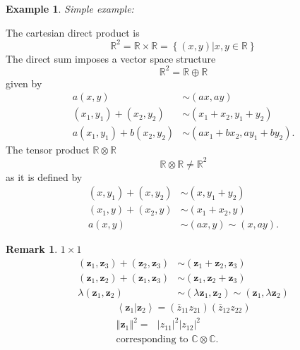 \documentclass[aps,preprint]{revtex4}
\newtheorem{example}[theorem]{Example}
\newtheorem{remark}[theorem]{Remark}
\begin{document}
\begin{example}
Simple example:
\end{example}

The cartesian direct product is 
\begin{equation}
\mathbb{R}^{2}=\mathbb{R\times R}=\left\{ \left. \left( x,y\right)
\right\vert x,y\in \mathbb{R}\right\}
\end{equation}%
The direct sum imposes a vector space structure 
\begin{equation}
\mathbb{R}^{2}=\mathbb{R\oplus R}
\end{equation}%
given by 
\begin{align}
a\left( x,y\right) & \sim \left( ax,ay\right) \\
\left( x_{1},y_{1}\right) +\left( x_{2},y_{2}\right) & \sim \left(
x_{1}+x_{2},y_{1}+y_{2}\right) \\
a\left( x_{1},y_{1}\right) +b\left( x_{2},y_{2}\right) & \sim \left(
ax_{1}+bx_{2},ay_{1}+by_{2}\right) .
\end{align}%
The tensor product $\mathbb{R\otimes R}$%
\begin{equation}
\mathbb{R\otimes R\neq R}^{2}
\end{equation}%
as it is defined by 
\begin{align}
\left( x,y_{1}\right) +\left( x,y_{2}\right) & \sim \left(
x,y_{1}+y_{2}\right) \\
\left( x_{1},y\right) +\left( x_{2},y\right) & \sim \left(
x_{1}+x_{2},y\right) \\
a\left( x,y\right) & \sim \left( ax,y\right) \sim \left( x,ay\right) .
\end{align}

\begin{remark}
$1\times 1$%
\begin{align}
\left( \mathbf{z}_{1},\mathbf{z}_{3}\right) +\left( \mathbf{z}_{2},\mathbf{z}%
_{3}\right) & \sim \left( \mathbf{z}_{1}+\mathbf{z}_{2},\mathbf{z}_{3}\right)
\\
\left( \mathbf{z}_{1},\mathbf{z}_{2}\right) +\left( \mathbf{z}_{1},\mathbf{z}%
_{3}\right) & \sim \left( \mathbf{z}_{1},\mathbf{z}_{2}+\mathbf{z}_{3}\right)
\\
\lambda \left( \mathbf{z}_{1},\mathbf{z}_{2}\right) & \sim \left( \lambda 
\mathbf{z}_{1},\mathbf{z}_{2}\right) \sim \left( \mathbf{z}_{1},\lambda 
\mathbf{z}_{2}\right)
\end{align}%
\begin{gather}
\left\langle \left. \mathbf{z}_{1}\right\vert \mathbf{z}_{2}\right\rangle
=\left( \overline{z}_{11}z_{21}\right) \left( \overline{z}_{12}z_{22}\right)
\\
\left\Vert \mathbf{z}_{1}\right\Vert ^{2}=\text{ }\left\vert
z_{11}\right\vert ^{2}\left\vert z_{12}\right\vert ^{2} \\
\text{corresponding to }\mathbb{C\otimes C}.
\end{gather}
\end{remark}
\end{document}
